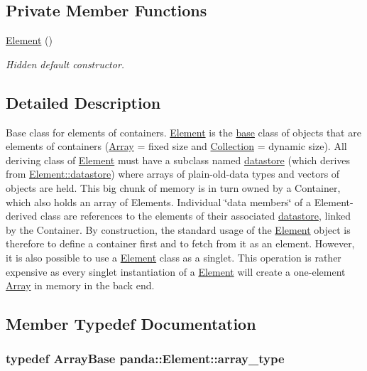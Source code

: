 \subsection*{Private Member Functions}
\begin{DoxyCompactItemize}
\item 
\hyperlink{classpanda_1_1Element_a57d1ed813613cb076739964b7f994c92}{Element} ()
\begin{DoxyCompactList}\small\item\em Hidden default constructor. \item\end{DoxyCompactList}\end{DoxyCompactItemize}


\subsection{Detailed Description}
Base class for elements of containers. \hyperlink{classpanda_1_1Element}{Element} is the \hyperlink{namespacepanda_1_1base}{base} class of objects that are elements of containers (\hyperlink{classpanda_1_1Array}{Array} = fixed size and \hyperlink{classpanda_1_1Collection}{Collection} = dynamic size). All deriving class of \hyperlink{classpanda_1_1Element}{Element} must have a subclass named \hyperlink{structpanda_1_1Element_1_1datastore}{datastore} (which derives from \hyperlink{structpanda_1_1Element_1_1datastore}{Element::datastore}) where arrays of plain-\/old-\/data types and vectors of objects are held. This big chunk of memory is in turn owned by a Container, which also holds an array of Elements. Individual \char`\"{}data members\char`\"{} of a Element-\/derived class are references to the elements of their associated \hyperlink{structpanda_1_1Element_1_1datastore}{datastore}, linked by the Container. By construction, the standard usage of the \hyperlink{classpanda_1_1Element}{Element} object is therefore to define a container first and to fetch from it as an element. However, it is also possible to use a \hyperlink{classpanda_1_1Element}{Element} class as a singlet. This operation is rather expensive as every singlet instantiation of a \hyperlink{classpanda_1_1Element}{Element} will create a one-\/element \hyperlink{classpanda_1_1Array}{Array} in memory in the back end. 

\subsection{Member Typedef Documentation}
\hypertarget{classpanda_1_1Element_ab2756a177602f7ab426c4e5d5dbb3b68}{
\subsubsection[{array\_\-type}]{\setlength{\rightskip}{0pt plus 5cm}typedef {\bf ArrayBase} {\bf panda::Element::array\_\-type}}}
\label{classpanda_1_1Element_ab2756a177602f7ab426c4e5d5dbb3b68}


